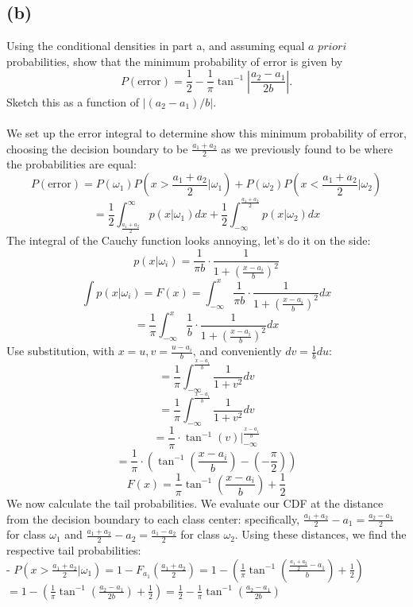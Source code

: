 \documentclass{article}
\begin{document}
{\subsection*{(b)}
Using the conditional densities in part a, and assuming equal \(a\) \(priori\) probabilities, show that the minimum probability of error is given by 
\[
  P(\text{error}) = \frac{1}{2} - \frac{1}{\pi} \tan^{-1} |\frac{a_2 - a_1}{2b}|.
\]
Sketch this as a function of \(|(a_2 - a_1) / b|\). \\ \\
We set up the error integral to determine show this minimum probability of error, choosing the decision boundary to be \(\frac{a_1 + a_2}{2}\) as we previously found to be where the probabilities are equal:
\[
  P(\text{error}) = P(\omega_1)P(x > \frac{a_1 + a_2}{2} | \omega_1) + P(\omega_2)P(x < \frac{a_1 + a_2}{2} | \omega_2)
\]
\[
  = \frac{1}{2} \int_{\frac{a_1 + a_2}{2}}^{\infty} p(x | \omega_1) dx + \frac{1}{2} \int_{-\infty}^{\frac{a_1 + a_2}{2}} p(x | \omega_2) dx
\]
The integral of the Cauchy function looks annoying, let's do it on the side:
\[
  p(x | \omega_i) = \frac{1}{\pi b} \cdot \frac{1}{1 + (\frac{x-a_i}{b})^2}
\]
\[
  \int p(x | \omega_i) = F(x) = \int_{-\infty}^{x} \frac{1}{\pi b} \cdot \frac{1}{1 + (\frac{x-a_i}{b})^2} dx
\]
\[
  = \frac{1}{\pi} \int_{-\infty}^{x} \frac{1}{b} \cdot \frac{1}{1 + (\frac{x-a_i}{b})^2} dx
\]
Use substitution, with \(x = u, v = \frac{u - a_i}{b}\), and conveniently \(dv = \frac{1}{b}du\):
\[
  = \frac{1}{\pi} \int_{-\infty}^{\frac{x - a_i}{b}} \frac{1}{1 + v^2} dv
\]
\[
  = \frac{1}{\pi} \int_{-\infty}^{\frac{x - a_i}{b}} \frac{1}{1 + v^2} dv
\]
\[
  = \frac{1}{\pi} \cdot \tan^{-1}(v) |_{-\infty}^{\frac{x - a_i}{b}}
\]
\[
  = \frac{1}{\pi} \cdot (\tan^{-1}(\frac{x - a_i}{b})- (-\frac{\pi}{2}))
\]
\[
  F(x) = \frac{1}{\pi} \tan^{-1}(\frac{x - a_i}{b}) + \frac{1}{2}
\]
We now calculate the tail probabilities. We evaluate our CDF at the distance from the decision boundary to each class center: specifically, \(\frac{a_1 + a_2}{2} - a_1 = \frac{a_2 - a_1}{2}\) for class \(\omega_1\) and \(\frac{a_1 + a_2}{2} - a_2 = \frac{a_1 - a_2}{2}\) for class \(\omega_2\). Using these distances, we find the respective tail probabilities: \\
- \(P(x > \frac{a_1 + a_2}{2} | \omega_1) = 1 - F_{a_1}(\frac{a_1 + a_2}{2}) = 1 - (\frac{1}{\pi} \tan^{-1}(\frac{\frac{a_1 + a_2}{2} - a_1}{b}) + \frac{1}{2})\) \\ 
\(= 1 - (\frac{1}{\pi} \tan^{-1}(\frac{a_2 - a_1}{2b}) + \frac{1}{2}) = \frac{1}{2} - \frac{1}{\pi} \tan^{-1}(\frac{a_2 - a_1}{2b})\) \\
}
\end{document}
